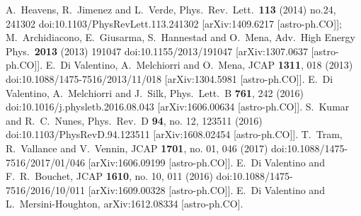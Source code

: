 \documentclass[aps,prd,a4paper,twocolumn,amsmath,showpacs,superscriptaddress,nofootinbib,preprintnumbers]{revtex4-1}
\begin{document}
\begin{thebibliography}{99}
  A.~Heavens, R.~Jimenez and L.~Verde,
  Phys.\ Rev.\ Lett.\  {\bf 113} (2014) no.24,  241302
  doi:10.1103/PhysRevLett.113.241302
  [arXiv:1409.6217 [astro-ph.CO]];
  M.~Archidiacono, E.~Giusarma, S.~Hannestad and O.~Mena,
  Adv.\ High Energy Phys.\  {\bf 2013} (2013) 191047
  doi:10.1155/2013/191047
  [arXiv:1307.0637 [astro-ph.CO]].
  E.~Di Valentino, A.~Melchiorri and O.~Mena,
  JCAP {\bf 1311}, 018 (2013)
  doi:10.1088/1475-7516/2013/11/018
  [arXiv:1304.5981 [astro-ph.CO]].
  E.~Di Valentino, A.~Melchiorri and J.~Silk,
  Phys.\ Lett.\ B {\bf 761}, 242 (2016)
  doi:10.1016/j.physletb.2016.08.043
  [arXiv:1606.00634 [astro-ph.CO]].
  S.~Kumar and R.~C.~Nunes,
  Phys.\ Rev.\ D {\bf 94}, no. 12, 123511 (2016)
  doi:10.1103/PhysRevD.94.123511
  [arXiv:1608.02454 [astro-ph.CO]].
  T.~Tram, R.~Vallance and V.~Vennin,
  JCAP {\bf 1701}, no. 01, 046 (2017)
  doi:10.1088/1475-7516/2017/01/046
  [arXiv:1606.09199 [astro-ph.CO]].
  E.~Di Valentino and F.~R.~Bouchet,
  JCAP {\bf 1610}, no. 10, 011 (2016)
  doi:10.1088/1475-7516/2016/10/011
  [arXiv:1609.00328 [astro-ph.CO]].
  E.~Di Valentino and L.~Mersini-Houghton,
  arXiv:1612.08334 [astro-ph.CO].
  

\end{thebibliography}
\end{document}
